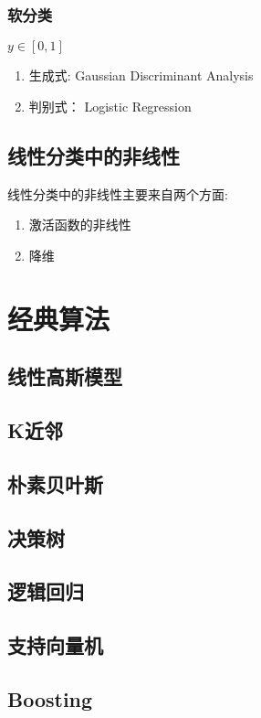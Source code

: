 \documentclass[11pt]{article}
\begin{document}
\subsubsection{软分类}
\label{sec:orgf7d7146}
\(y \in \left[ 0,1  \right]\)
\begin{enumerate}
\item 生成式: Gaussian Discriminant Analysis
\label{sec:org8d2f5d5}
\item 判别式： Logistic Regression
\label{sec:org501a54e}
\end{enumerate}
\subsection{线性分类中的非线性}
\label{sec:org9243dd5}
线性分类中的非线性主要来自两个方面:
\begin{enumerate}
\item 激活函数的非线性
\item 降维
\end{enumerate}

\section{经典算法}
\label{sec:orgf2cce2d}
\subsection{线性高斯模型}
\label{sec:org4caddef}
\subsection{K近邻}
\label{sec:org841087f}
\subsection{朴素贝叶斯}
\label{sec:orgd49e1a0}
\subsection{决策树}
\label{sec:orge127ef9}
\subsection{逻辑回归}
\label{sec:org204462d}
\subsection{支持向量机}
\label{sec:orgd0f0ebd}
\subsection{Boosting}
\label{sec:orgbf1eebc}
\end{document}
